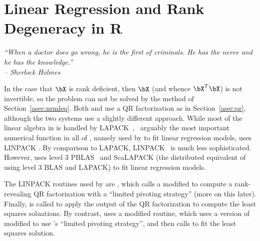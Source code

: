 \chapter{Linear Regression and Rank Degeneracy in R}


{\it
``When a doctor does go wrong, he is the first of criminals.
He has the nerve and he has the knowledge.'' \\
\--- Sherlock Holmes
}
\vspace{0.5cm}


In the case that $\bX$ is rank deficient, then $\bX$ (and whence $\bX^T\bX$) is not invertible, so the problem can not be solved by the method of Section~\ref{asec:nrmleq}.  Both  and
 use a QR factorization as in Section~\ref{asec:qr}, although the two systems use a slightly different approach.  While most of the linear algebra in  is handled by
LAPACK~\citep{lug},~ arguably the most important numerical function in all of , namely  used by  to fit linear regression models, uses LINPACK \citep{linpack}.  By comparison to LAPACK,
LINPACK~ is much less sophisticated.  However,
 uses level 3
PBLAS~ and ScaLAPACK (the distributed equivalent of using level 3 BLAS and LAPACK) to fit linear regression models.

The LINPACK routines used by  are , which calls a modified  to compute a rank-revealing
QR factorization
with a ``limited pivoting strategy'' (more on this later).  Finally,  is called to apply the output of the QR factorization to compute the least squares soluations.  By contrast,
 uses a modified  routine, which uses a version of  modified to use 's ``limited pivoting strategy'', and then calls  to fit the least squares solution.

